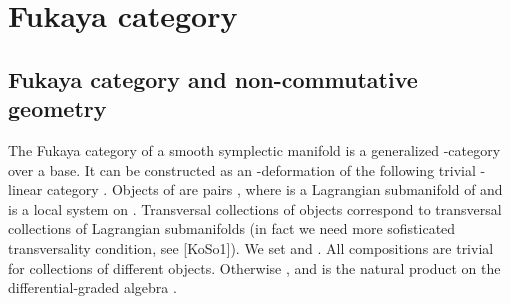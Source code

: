 \documentclass[a4paper,12pt]{article}
\begin{document}
\section{Fukaya category}


\subsection{Fukaya category and non-commutative geometry}

The Fukaya category \coordHE{} of a smooth symplectic manifold \coordHE{}
is a generalized \myHighlight{$\A$}\coordHE{}-category over a base. It can be constructed
as an \myHighlight{$\A$}\coordHE{}-deformation of the following trivial \myHighlight{$\C$}\coordHE{}-linear category \coordHE{}.
Objects of \coordHE{} are pairs \coordHE{}, where \coordHE{} is a Lagrangian
submanifold of \coordHE{} and \myHighlight{$\rho$}\coordHE{} is a local system on \coordHE{}.
Transversal collections of objects correspond to transversal
collections of Lagrangian submanifolds (in fact we need more sofisticated
transversality condition, see [KoSo1]).
We set 
\coordHE{} and
\coordHE{}.
All compositions \coordHE{} are trivial for collections
of different objects. Otherwise \coordHE{}, and \coordHE{}  is the natural product
on the differential-graded algebra  \coordHE{}.
\end{document}
